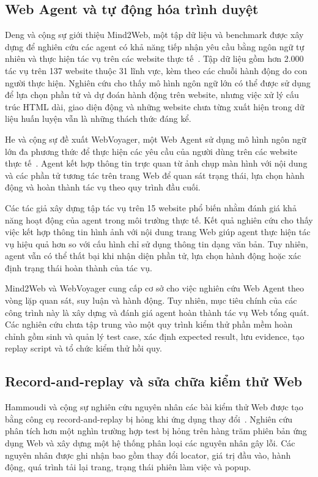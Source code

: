\subsection{Web Agent và tự động hóa trình duyệt}

Deng và cộng sự giới thiệu Mind2Web, một tập dữ liệu và benchmark được xây dựng để nghiên cứu các agent có khả năng tiếp nhận yêu cầu bằng ngôn ngữ tự nhiên và thực hiện tác vụ trên các website thực tế~\cite{deng2023mind2web}. Tập dữ liệu gồm hơn 2.000 tác vụ trên 137 website thuộc 31 lĩnh vực, kèm theo các chuỗi hành động do con người thực hiện. Nghiên cứu cho thấy mô hình ngôn ngữ lớn có thể được sử dụng để lựa chọn phần tử và dự đoán hành động trên website, nhưng việc xử lý cấu trúc HTML dài, giao diện động và những website chưa từng xuất hiện trong dữ liệu huấn luyện vẫn là những thách thức đáng kể.

He và cộng sự đề xuất WebVoyager, một Web Agent sử dụng mô hình ngôn ngữ lớn đa phương thức để thực hiện các yêu cầu của người dùng trên các website thực tế~\cite{he2024webvoyager}. Agent kết hợp thông tin trực quan từ ảnh chụp màn hình với nội dung và các phần tử tương tác trên trang Web để quan sát trạng thái, lựa chọn hành động và hoàn thành tác vụ theo quy trình đầu cuối.

Các tác giả xây dựng tập tác vụ trên 15 website phổ biến nhằm đánh giá khả năng hoạt động của agent trong môi trường thực tế. Kết quả nghiên cứu cho thấy việc kết hợp thông tin hình ảnh với nội dung trang Web giúp agent thực hiện tác vụ hiệu quả hơn so với cấu hình chỉ sử dụng thông tin dạng văn bản. Tuy nhiên, agent vẫn có thể thất bại khi nhận diện phần tử, lựa chọn hành động hoặc xác định trạng thái hoàn thành của tác vụ.

Mind2Web và WebVoyager cung cấp cơ sở cho việc nghiên cứu Web Agent theo vòng lặp quan sát, suy luận và hành động. Tuy nhiên, mục tiêu chính của các công trình này là xây dựng và đánh giá agent hoàn thành tác vụ Web tổng quát. Các nghiên cứu chưa tập trung vào một quy trình kiểm thử phần mềm hoàn chỉnh gồm sinh và quản lý test case, xác định expected result, lưu evidence, tạo replay script và tổ chức kiểm thử hồi quy.

\subsection{Record-and-replay và sửa chữa kiểm thử Web}

Hammoudi và cộng sự nghiên cứu nguyên nhân các bài kiểm thử Web được tạo bằng công cụ record-and-replay bị hỏng khi ứng dụng thay đổi~\cite{7515470}. Nghiên cứu phân tích hơn một nghìn trường hợp test bị hỏng trên hàng trăm phiên bản ứng dụng Web và xây dựng một hệ thống phân loại các nguyên nhân gây lỗi. Các nguyên nhân được ghi nhận bao gồm thay đổi locator, giá trị đầu vào, hành động, quá trình tải lại trang, trạng thái phiên làm việc và popup.

